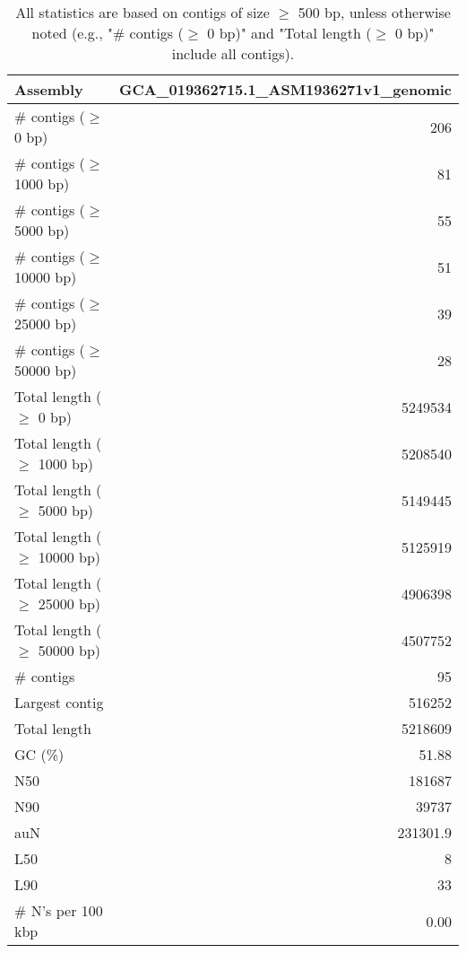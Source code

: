 \documentclass[12pt,a4paper]{article}
\begin{document}
\begin{table}[ht]
\begin{center}
\caption{All statistics are based on contigs of size $\geq$ 500 bp, unless otherwise noted (e.g., "\# contigs ($\geq$ 0 bp)" and "Total length ($\geq$ 0 bp)" include all contigs).}
\begin{tabular}{|l*{1}{|r}|}
\hline
Assembly & GCA\_019362715.1\_ASM1936271v1\_genomic \\ \hline
\# contigs ($\geq$ 0 bp) & 206 \\ \hline
\# contigs ($\geq$ 1000 bp) & 81 \\ \hline
\# contigs ($\geq$ 5000 bp) & 55 \\ \hline
\# contigs ($\geq$ 10000 bp) & 51 \\ \hline
\# contigs ($\geq$ 25000 bp) & 39 \\ \hline
\# contigs ($\geq$ 50000 bp) & 28 \\ \hline
Total length ($\geq$ 0 bp) & 5249534 \\ \hline
Total length ($\geq$ 1000 bp) & 5208540 \\ \hline
Total length ($\geq$ 5000 bp) & 5149445 \\ \hline
Total length ($\geq$ 10000 bp) & 5125919 \\ \hline
Total length ($\geq$ 25000 bp) & 4906398 \\ \hline
Total length ($\geq$ 50000 bp) & 4507752 \\ \hline
\# contigs & 95 \\ \hline
Largest contig & 516252 \\ \hline
Total length & 5218609 \\ \hline
GC (\%) & 51.88 \\ \hline
N50 & 181687 \\ \hline
N90 & 39737 \\ \hline
auN & 231301.9 \\ \hline
L50 & 8 \\ \hline
L90 & 33 \\ \hline
\# N's per 100 kbp & 0.00 \\ \hline
\end{tabular}
\end{center}
\end{table}
\end{document}
